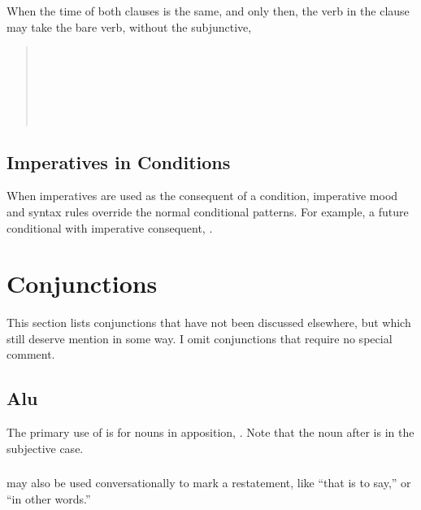 \noindent When the time of both clauses is the same, and only then,
the verb in the  clause may take the bare verb, without the
subjunctive,

\begin{quotation}
\noindent{}\\
\indent{}\\
\noindent{}\\
\indent{}\\
\noindent{}\\
\indent{}
\end{quotation}

\subsection{Imperatives in Conditions} When imperatives are used as
the consequent of a condition, imperative mood and syntax rules
override the normal conditional patterns.  For example, a future
conditional with imperative consequent,  .  


\section{Conjunctions}
\noindent This section lists conjunctions that have not been discussed
elsewhere, but which still deserve mention in some way.  I omit
conjunctions that require no special comment.

\subsection{Alu} The primary use of  is for nouns in
apposition,  .  Note
that the noun after  is in the subjective case.
\label{syn:conj:alu}

\subsubsection{}  may also be used conversationally to mark a
restatement, like ``that is to say,'' or ``in other words.''
 

